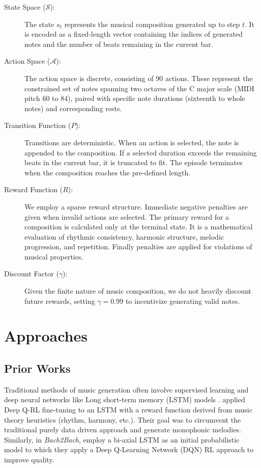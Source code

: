 \documentclass{article}
\begin{document}
\begin{description}
  \item[State Space ($\mathcal{S}$):] The state $s_t$ represents the musical composition generated up to step $t$. It is encoded as a fixed-length vector containing the indices of generated notes and the number of beats remaining in the current bar.

  \item[Action Space ($\mathcal{A}$):] The action space is discrete, consisting of 90 actions. These represent the constrained set of notes spanning two octaves of the C major scale (MIDI pitch 60 to 84), paired with specific note durations (sixteenth to whole notes) and corresponding rests.

  \item[Transition Function ($P$):] Transitions are deterministic. When an action is selected, the note is appended to the composition. If a selected duration exceeds the remaining beats in the current bar, it is truncated to fit. The episode terminates when the composition reaches the pre-defined length.

  \item[Reward Function ($R$):] We employ a sparse reward structure. Immediate negative penalties are given when invalid actions are selected. The primary reward for a composition is calculated only at the terminal state. It is a mathematical evaluation of rhythmic consistency, harmonic structure, melodic progression, and repetition. Finally penalties are applied for violations of musical properties.

  \item[Discount Factor ($\gamma$):] Given the finite nature of music composition, we do not heavily discount future rewards, setting $\gamma = 0.99$ to incentivize generating valid notes.
\end{description}

\section{Approaches}

\subsection{Prior Works}

Traditional methods of music generation often involve supervised learning and deep neural networks like Long short-term memory (LSTM) models \citep{lstm-paper}. \citet{RNN-finetune} applied Deep Q-RL \citep{dqn-paper} fine-tuning to an LSTM with a reward function derived from music theory heuristics (rhythm, harmony, etc.). Their goal was to circumvent the traditional purely data driven approach and generate monophonic melodies. Similarly, in \textit{Bach2Bach}, \citet{bach2bach} employ a bi-axial LSTM as an initial probabilistic model to which they apply a Deep Q-Learning Network (DQN) RL approach to improve quality.
\end{document}
